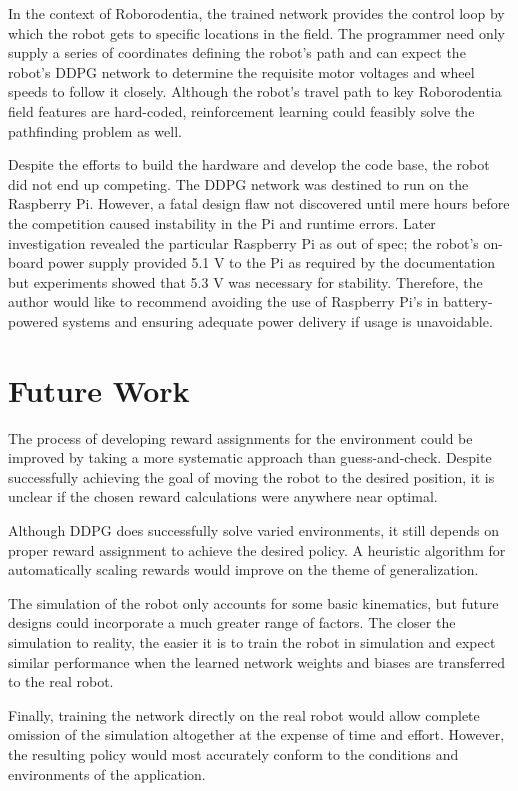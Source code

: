 In the context of Roborodentia, the trained network provides the control loop by which the robot gets to specific locations in the field. The programmer need only supply a series of coordinates defining the robot's path and can expect the robot's DDPG network to determine the requisite motor voltages and wheel speeds to follow it closely. Although the robot's travel path to key Roborodentia field features are hard-coded, reinforcement learning could feasibly solve the pathfinding problem as well. 

Despite the efforts to build the hardware and develop the code base, the robot did not end up competing. The DDPG network was destined to run on the Raspberry Pi. However, a fatal design flaw not discovered until mere hours before the competition caused instability in the Pi and runtime errors. Later investigation revealed the particular Raspberry Pi as out of spec; the robot's on-board power supply provided 5.1 V to the Pi as required by the documentation but experiments showed that 5.3 V was necessary for stability. Therefore, the author would like to recommend avoiding the use of Raspberry Pi's in battery-powered systems and ensuring adequate power delivery if usage is unavoidable.

\section{Future Work}
The process of developing reward assignments for the environment could be improved by taking a more systematic approach than guess-and-check. Despite successfully achieving the goal of moving the robot to the desired position, it is unclear if the chosen reward calculations were anywhere near optimal. 

Although DDPG does successfully solve varied environments, it still depends on proper reward assignment to achieve the desired policy. A heuristic algorithm for automatically scaling rewards would improve on the theme of generalization. 

The simulation of the robot only accounts for some basic kinematics, but future designs could incorporate a much greater range of factors. The closer the simulation to reality, the easier it is to train the robot in simulation and expect similar performance when the learned network weights and biases are transferred to the real robot.

Finally, training the network directly on the real robot would allow complete omission of the simulation altogether at the expense of time and effort. However, the resulting policy would most accurately conform to the conditions and environments of the application.